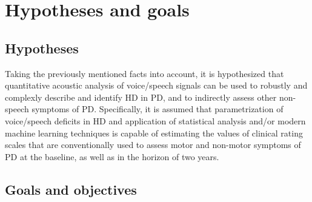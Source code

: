 \chapter[Hypotheses and goals]{Hypotheses and goals}
\label{ch3}

\section{Hypotheses}
\label{ch3_1}

Taking the previously mentioned facts into account, it is hypothesized that quantitative acoustic analysis of voice/speech signals can be used to robustly and complexly describe and identify HD in PD, and to indirectly assess other non-speech symptoms of PD. Specifically, it is assumed that parametrization of voice/speech deficits in HD and application of statistical analysis and/or modern machine learning techniques is capable of estimating the values of clinical rating scales that are conventionally used to assess motor and non-motor symptoms of PD at the baseline, as well as in the horizon of two years.

\section{Goals and objectives}
\label{ch3_2}

